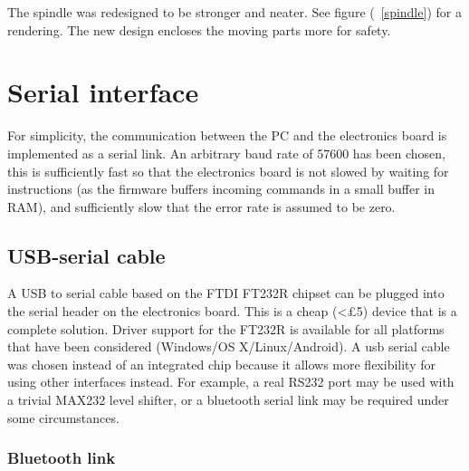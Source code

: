 The spindle was redesigned to be stronger and neater. See figure (~\ref{spindle}) for a rendering.
The new design encloses the moving parts more for safety.

\section{Serial interface}
For simplicity, the communication between the PC and the electronics board is implemented as a serial link. An arbitrary baud rate of 57600 has been
chosen, this is sufficiently fast so that the electronics board is not slowed by waiting for instructions (as the firmware buffers incoming commands in
a small buffer in RAM), and sufficiently slow that the error rate is assumed to be zero.

\subsection{USB-serial cable}
A USB to serial cable based on the FTDI FT232R chipset can be plugged into the serial header on the electronics board. This is a cheap (\textless \pounds 5) device that is 
a complete solution. Driver support for the FT232R is available for all platforms that have been considered (Windows/OS X/Linux/Android). A usb serial cable
was chosen instead of an integrated chip because it allows more flexibility for using other interfaces instead. For example, a real RS232 port may be used with a trivial
MAX232 level shifter, or a bluetooth serial link may be required under
some circumstances.



\subsubsection{Bluetooth link}

